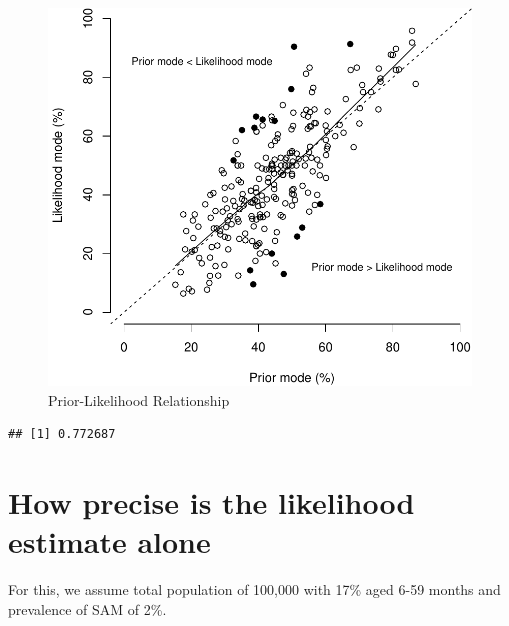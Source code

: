 \documentclass[12pt,a4paper]{article}
\newenvironment{Shaded}{\begin{snugshade}}{\end{snugshade}}
\newcommand{\KeywordTok}[1]{\textcolor[rgb]{0.13,0.29,0.53}{\textbf{#1}}}
\newcommand{\OperatorTok}[1]{\textcolor[rgb]{0.81,0.36,0.00}{\textbf{#1}}}
\newcommand{\NormalTok}[1]{#1}
\begin{document}
\begin{figure}[H]

{\centering \includegraphics{squeacAttack_files/figure-latex/likescatter-1} 

}

\caption{Prior-Likelihood Relationship}\label{fig:likescatter}
\end{figure}

\begin{Shaded}
\end{Shaded}

\begin{verbatim}
## [1] 0.772687
\end{verbatim}

\newpage

\hypertarget{how-precise-is-the-likelihood-estimate-alone}{%
\section{How precise is the likelihood estimate
alone}\label{how-precise-is-the-likelihood-estimate-alone}}

For this, we assume total population of 100,000 with 17\% aged 6-59
months and prevalence of SAM of 2\%.
\end{document}
